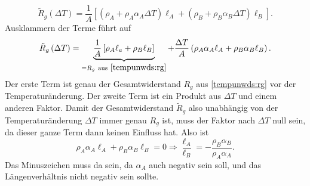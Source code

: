 \begin{Answer}[ref=tempind]
\begin{equation*}
	\tilde{R}_g\left(\Delta T\right) = \frac{1}{A}\left[\left(\rho_A + \rho_A \alpha_A \Delta T\right)\ell_A + \left(\rho_B + \rho_B \alpha_B \Delta T\right) \ell_B \right].
\end{equation*}
Ausklammern der Terme führt auf
\begin{equation}\label{tempunwds:rgtemp}
	\tilde{R}_g\left(\Delta T\right) =\underbrace{\frac{1}{A}\left[ \rho_A \ell_a + \rho_B \ell_B\right]}_{= R_g~  \mathrm{aus}~ \eqref{tempunwds:rg}} +\frac{\Delta T}{A} \left(\rho_A \alpha_A \ell_A + \rho_B \alpha_B \ell_B \right).
\end{equation}
Der erste Term ist genau der Gesamtwiderstand $R_g$ aus \eqref{tempunwds:rg} vor der Temperaturänderung. Der zweite Term ist ein Produkt aus $\Delta T$ und einem anderen Faktor. Damit der Gesamtwiderstand $\tilde{R}_g$ also unabhängig von der Temperaturänderung $\Delta T$ immer genau $R_g$ ist, muss der Faktor nach $\Delta T$ null sein, da dieser ganze Term dann keinen Einfluss hat. Also ist
\begin{equation}
\boxed{
	\rho_A \alpha_A\ell_A + \rho_B \alpha_B\ell_B = 0 \Rightarrow \frac{\ell_A}{\ell_B} = -\frac{\rho_B\alpha_B}{\rho_A\alpha_A}}.
\end{equation}
Das Minuszeichen muss da sein, da $\alpha_A$ auch negativ sein soll, und das Längenverhältnis nicht negativ sein sollte.
\end{Answer}
